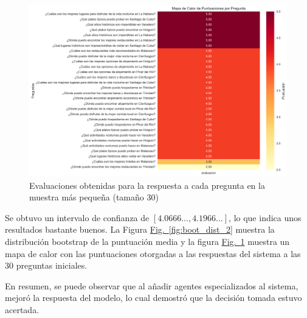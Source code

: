 \documentclass[10pt]{llncs}
\newcommand{\figref}[1]{\hyperref[#1]{Fig.~\ref*{#1}}}
\begin{document}
\begin{figure}[h]
\centering
\includegraphics[width=1\textwidth]{../src/experiments/specialized_agents/quality_heatmap_20250614-005640.png}
\caption{Evaluaciones obtenidas para la respuesta a cada pregunta en la muestra más pequeña (tamaño 30)}
\label{fig:eval_2}
\end{figure}

\begin{remark}
Se obtuvo un intervalo de confianza de $[4.0666...,4.1966...]$, lo que indica unos resultados bastante buenos. 
La Figura {\figref{fig:boot_dist_2}} muestra la distribución bootstrap de la puntuación media y la figura 
{\figref{fig:eval_2}} muestra un mapa de calor con las puntuaciones otorgadas a las respuestas del sistema a las 
30 preguntas iniciales.
\end{remark}

En resumen, se puede observar que al añadir agentes especializados al sistema, mejoró la respuesta del modelo, lo cual demostró 
que la decisión tomada estuvo acertada.
\end{document}
